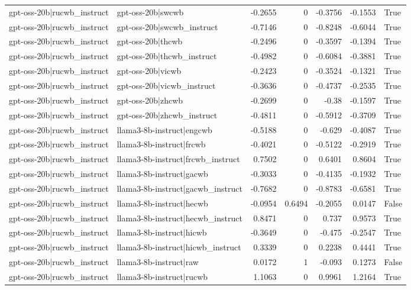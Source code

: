 \begin{table}
\begin{tabular}{l l r r r r l}
gpt-oss-20b|rucwb_instruct & gpt-oss-20b|swcwb & -0.2655 & 0 & -0.3756 & -0.1553 & True \\
gpt-oss-20b|rucwb_instruct & gpt-oss-20b|swcwb_instruct & -0.7146 & 0 & -0.8248 & -0.6044 & True \\
gpt-oss-20b|rucwb_instruct & gpt-oss-20b|thcwb & -0.2496 & 0 & -0.3597 & -0.1394 & True \\
gpt-oss-20b|rucwb_instruct & gpt-oss-20b|thcwb_instruct & -0.4982 & 0 & -0.6084 & -0.3881 & True \\
gpt-oss-20b|rucwb_instruct & gpt-oss-20b|vicwb & -0.2423 & 0 & -0.3524 & -0.1321 & True \\
gpt-oss-20b|rucwb_instruct & gpt-oss-20b|vicwb_instruct & -0.3636 & 0 & -0.4737 & -0.2535 & True \\
gpt-oss-20b|rucwb_instruct & gpt-oss-20b|zhcwb & -0.2699 & 0 & -0.38 & -0.1597 & True \\
gpt-oss-20b|rucwb_instruct & gpt-oss-20b|zhcwb_instruct & -0.4811 & 0 & -0.5912 & -0.3709 & True \\
gpt-oss-20b|rucwb_instruct & llama3-8b-instruct|engcwb & -0.5188 & 0 & -0.629 & -0.4087 & True \\
gpt-oss-20b|rucwb_instruct & llama3-8b-instruct|frcwb & -0.4021 & 0 & -0.5122 & -0.2919 & True \\
gpt-oss-20b|rucwb_instruct & llama3-8b-instruct|frcwb_instruct & 0.7502 & 0 & 0.6401 & 0.8604 & True \\
gpt-oss-20b|rucwb_instruct & llama3-8b-instruct|gacwb & -0.3033 & 0 & -0.4135 & -0.1932 & True \\
gpt-oss-20b|rucwb_instruct & llama3-8b-instruct|gacwb_instruct & -0.7682 & 0 & -0.8783 & -0.6581 & True \\
gpt-oss-20b|rucwb_instruct & llama3-8b-instruct|hecwb & -0.0954 & 0.6494 & -0.2055 & 0.0147 & False \\
gpt-oss-20b|rucwb_instruct & llama3-8b-instruct|hecwb_instruct & 0.8471 & 0 & 0.737 & 0.9573 & True \\
gpt-oss-20b|rucwb_instruct & llama3-8b-instruct|hicwb & -0.3649 & 0 & -0.475 & -0.2547 & True \\
gpt-oss-20b|rucwb_instruct & llama3-8b-instruct|hicwb_instruct & 0.3339 & 0 & 0.2238 & 0.4441 & True \\
gpt-oss-20b|rucwb_instruct & llama3-8b-instruct|raw & 0.0172 & 1 & -0.093 & 0.1273 & False \\
gpt-oss-20b|rucwb_instruct & llama3-8b-instruct|rucwb & 1.1063 & 0 & 0.9961 & 1.2164 & True \\

\end{tabular}
\end{table}
